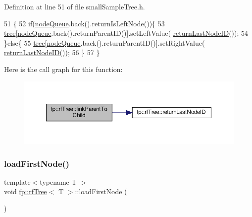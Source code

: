 Definition at line 51 of file small\+Sample\+Tree.\+h.


\begin{DoxyCode}
51                                                \{
52                     \textcolor{keywordflow}{if}(\hyperlink{classfp_1_1rfTree_af72d0a2f930fd480dfb4858885c2df23}{nodeQueue}.back().returnIsLeftNode())\{
53                         \hyperlink{classfp_1_1rfTree_a1d5c209715f4044a85878c17e2b3ee53}{tree}[\hyperlink{classfp_1_1rfTree_af72d0a2f930fd480dfb4858885c2df23}{nodeQueue}.back().returnParentID()].setLeftValue(
      \hyperlink{classfp_1_1rfTree_a1b8c04f3f3ce362d9627c2ca66d10efd}{returnLastNodeID}());
54                     \}\textcolor{keywordflow}{else}\{
55                         \hyperlink{classfp_1_1rfTree_a1d5c209715f4044a85878c17e2b3ee53}{tree}[\hyperlink{classfp_1_1rfTree_af72d0a2f930fd480dfb4858885c2df23}{nodeQueue}.back().returnParentID()].setRightValue(
      \hyperlink{classfp_1_1rfTree_a1b8c04f3f3ce362d9627c2ca66d10efd}{returnLastNodeID}());
56                     \}
57                 \}
\end{DoxyCode}
Here is the call graph for this function\+:
\nopagebreak
\begin{figure}[H]
\begin{center}
\leavevmode
\includegraphics[width=350pt]{classfp_1_1rfTree_aceaedc5d54bb429c1a3539f164a93d45_cgraph}
\end{center}
\end{figure}
\mbox{\label{classfp_1_1rfTree_a8757adc28b68d0a99f95b8bc5d6a38db}} 
\subsubsection{\texorpdfstring{load\+First\+Node()}{loadFirstNode()}\hspace{0.1cm}{\footnotesize\ttfamily [1/2]}}
{\footnotesize\ttfamily template$<$typename T $>$ \\
void \hyperlink{classfp_1_1rfTree}{fp\+::rf\+Tree}$<$ T $>$\+::load\+First\+Node (\begin{DoxyParamCaption}{ }\end{DoxyParamCaption})\hspace{0.3cm}{\ttfamily [inline]}}



